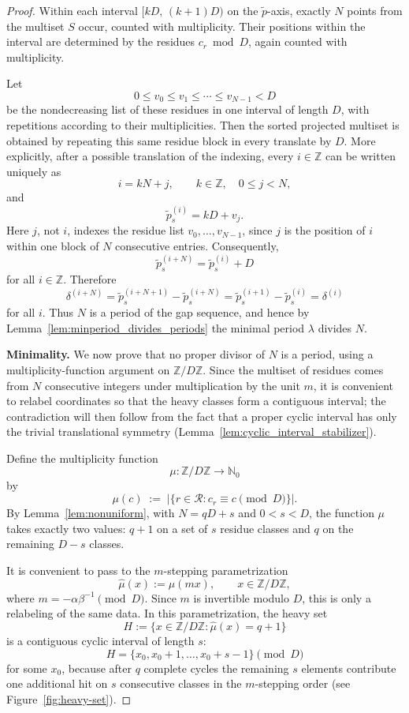 \documentclass[11pt,reqno]{amsart}
\theoremstyle{plain}
\theoremstyle{definition}
\theoremstyle{remark}
\begin{document}
\begin{proof}
Within each interval \([kD,\,(k+1)D)\) on the \(\tilde{p}\)-axis, exactly
\(N\) points from the multiset \(S\) occur, counted with multiplicity.
Their positions within the interval are determined by the residues
\(c_r \bmod D\), again counted with multiplicity.

Let
\[
    0 \le v_0 \le v_1 \le \cdots \le v_{N-1} < D
\]
be the nondecreasing list of these residues in one interval of length \(D\),
with repetitions according to their multiplicities.  Then the sorted
projected multiset is obtained by repeating this same residue block in every
translate by \(D\).  More explicitly, after a possible translation of the
indexing, every \(i \in \mathbb Z\) can be written uniquely as
\[
    i = kN + j,
    \qquad
    k\in\mathbb Z,\quad 0\le j<N,
\]
and
\[
    \tilde{p}_s^{(i)} = kD + v_j.
\]
Here \(j\), not \(i\), indexes the residue list
\(v_0,\ldots,v_{N-1}\), since \(j\) is the position of \(i\) within one
block of \(N\) consecutive entries.
Consequently,
\[
    \tilde{p}_s^{(i+N)}
    =
    \tilde{p}_s^{(i)} + D
\]
for all \(i\in\mathbb Z\).  Therefore
\[
    \delta^{(i+N)}
    =
    \tilde{p}_s^{(i+N+1)}-\tilde{p}_s^{(i+N)}
    =
    \tilde{p}_s^{(i+1)}-\tilde{p}_s^{(i)}
    =
    \delta^{(i)}
\]
for all \(i\).  Thus \(N\) is a period of the gap sequence, and hence
by Lemma~\ref{lem:minperiod_divides_periods} the minimal period
\(\lambda\) divides \(N\).

\medskip
\noindent\textbf{Minimality.}
We now prove that no proper divisor of \(N\) is a period, using a
multiplicity-function argument on \(\mathbb{Z}/D\mathbb{Z}\).  Since the
multiset of residues comes from \(N\) consecutive integers under
multiplication by the unit \(m\), it is convenient to relabel coordinates
so that the heavy classes form a contiguous interval; the contradiction
will then follow from the fact that a proper cyclic interval has only the
trivial translational symmetry
(Lemma~\ref{lem:cyclic_interval_stabilizer}).

Define the multiplicity function
\[
    \mu \colon \mathbb{Z}/D\mathbb{Z} \to \mathbb{N}_0
\]
by
\[
    \mu(c) \;:=\; \bigl|\{r \in \mathcal{R} : c_r \equiv c \pmod{D}\}\bigr|.
\]
By Lemma~\ref{lem:nonuniform}, with \(N = qD + s\) and \(0 < s < D\),
the function \(\mu\) takes exactly two values: \(q+1\) on a set of \(s\)
residue classes and \(q\) on the remaining \(D - s\) classes.

It is convenient to pass to the \(m\)-stepping parametrization
\[
    \hat{\mu}(x) := \mu(mx), \qquad x \in \mathbb{Z}/D\mathbb{Z},
\]
where \(m=-\alpha\beta^{-1}\pmod D\).
Since \(m\) is invertible modulo \(D\), this is only a relabeling of the
same data.  In this parametrization, the heavy set
\[
    H := \{x \in \mathbb{Z}/D\mathbb{Z} : \hat{\mu}(x)=q+1\}
\]
is a contiguous cyclic interval of length \(s\):
\[
    H = \{x_0, x_0+1, \ldots, x_0+s-1\}\pmod D
\]
for some \(x_0\), because after \(q\) complete cycles the remaining
\(s\) elements contribute one additional hit on \(s\) consecutive
classes in the \(m\)-stepping order (see Figure~\ref{fig:heavy-set}).


\end{proof}
\end{document}
